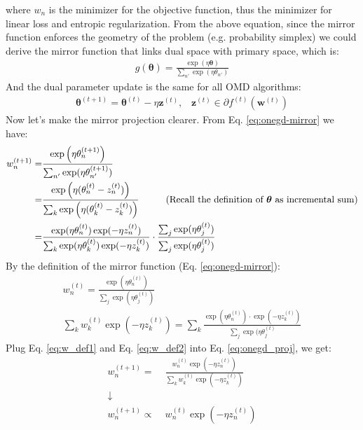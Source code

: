 \documentclass[11pt]{article}
\newcommand{\btheta}{\boldsymbol{\theta}}
\newcommand{\bz}{\boldsymbol{z}}
\newcommand{\bw}{\boldsymbol{w}}
\begin{document}
where $w_n$ is the minimizer for the objective function, thus the minimizer for linear loss and entropic regularization. From the above equation, since the mirror function enforces the geometry of the problem (e.g. probability simplex) we could derive the mirror function that links dual space with primary space, which is:
\begin{align}
    \label{eq:onegd-mirror}
    g(\btheta) = \frac{\exp (\eta \btheta)}{\sum_{n'} \exp (\eta \theta_{n'})}
\end{align}
And the dual parameter update is the same for all OMD algorithms:
\begin{align}
    \btheta^{(t+1)} = \btheta^{(t)} - \eta \bz^{(t)}, \;\;\; \bz^{(t)} \in \partial f^{(t)}(\bw^{(t)})
\end{align}
Now let's make the mirror projection clearer. From Eq. \ref{eq:onegd-mirror} we have:
\begin{align}
    w_n^{(t+1)} = &  \frac{\exp \left(\eta \theta_n^{(t+1)}\right)}{\sum_{n'} \exp (\eta \theta_{n'}^{(t+1)})} \nonumber \\
    = & \frac{\exp \left(\eta (\theta_n^{(t)} - z_n^{(t)})\right) }{\sum_{k} \exp \left( \eta (\theta_k^{(t)} - z_k^{(t)}) \right)} \nonumber \;\;\; \tag*{(Recall the definition of $\btheta$ as incremental sum)}\\  
    \label{eq:onegd_proj}
    = & \frac{\exp (\eta \theta_n^{(t)}) \exp (-\eta z_n^{(t)})}{\sum_k \exp (\eta \theta_k^{(t)}) \exp (-\eta z_k^{(t)})} \cdot \frac{\sum_j \exp (\eta \theta_j^{(t)})}{\sum_j \exp (\eta \theta_j^{(t)})}
\end{align}
By the definition of the mirror function (Eq. \ref{eq:onegd-mirror}):
\begin{align}
    \label{eq:w_def1}
    w_n^{(t)}=\frac{\exp (\eta \theta_n^{(t)})}{\sum_j \exp (\eta \theta_j^{(t)})} \\
    \label{eq:w_def2}
    \sum_k w_k^{(t)} \exp (-\eta z_k^{(t)}) = \sum_k \frac{\exp (\eta \theta_n^{(t)}) \cdot \exp (-\eta z_k^{(t)})}{\sum_j \exp(\eta \theta_j^{(t)}} 
\end{align}
Plug Eq. \ref{eq:w_def1} and Eq. \ref{eq:w_def2} into Eq. \ref{eq:onegd_proj}, we get:
\begin{align}
     w_n^{(t+1)} = & \frac{w_n^{(t)} \exp (-\eta z_n^{(t)})}{\sum_k w_k^{(t)} \exp (- \eta z_k^{(t)})} \;\;\; \\
    \downarrow \nonumber\\
    w_n^{(t+1)} \propto \; & w_n^{(t)}\exp(-\eta z_n^{(t)})
\end{align}
\end{document}
